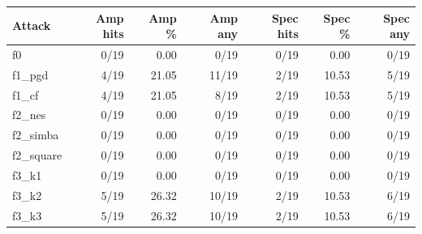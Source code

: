 \begin{tabular}{lrrrrrr}
\toprule
Attack & Amp hits & Amp \% & Amp any & Spec hits & Spec \% & Spec any \\
\midrule
f0 & 0/19 & 0.00 & 0/19 & 0/19 & 0.00 & 0/19 \\
f1\_pgd & 4/19 & 21.05 & 11/19 & 2/19 & 10.53 & 5/19 \\
f1\_cf & 4/19 & 21.05 & 8/19 & 2/19 & 10.53 & 5/19 \\
f2\_nes & 0/19 & 0.00 & 0/19 & 0/19 & 0.00 & 0/19 \\
f2\_simba & 0/19 & 0.00 & 0/19 & 0/19 & 0.00 & 0/19 \\
f2\_square & 0/19 & 0.00 & 0/19 & 0/19 & 0.00 & 0/19 \\
f3\_k1 & 0/19 & 0.00 & 0/19 & 0/19 & 0.00 & 0/19 \\
f3\_k2 & 5/19 & 26.32 & 10/19 & 2/19 & 10.53 & 6/19 \\
f3\_k3 & 5/19 & 26.32 & 10/19 & 2/19 & 10.53 & 6/19 \\
\bottomrule
\end{tabular}
